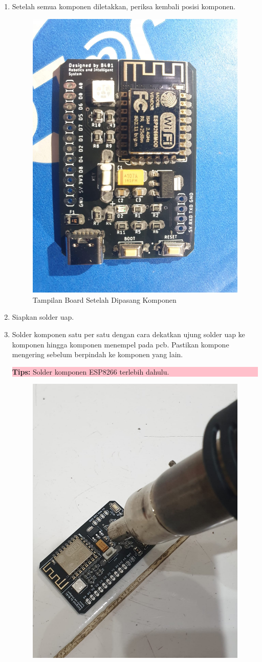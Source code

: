 \begin{enumerate}
    \item Setelah semua komponen diletakkan, periksa kembali posisi komponen.
    \begin{figure}[H]
        \centering
        \includegraphics[width=0.4\linewidth]{P4/img/5_tampilan_board_ketika_sudah_dipasang_komponen.jpeg}
        \caption{Tampilan Board Setelah Dipasang Komponen}
        \label{fig:KeadaanBoardSetelahDipasangKomponen}
    \end{figure}
    \item Siapkan solder uap.
    \item Solder komponen satu per satu dengan cara dekatkan ujung solder uap ke komponen hingga komponen menempel pada pcb. Pastikan kompone mengering sebelum berpindah ke komponen yang lain.
    \begin{center}
        \colorbox{pink}{\parbox{0.8\linewidth}{\textbf{Tips:} Solder komponen ESP8266 terlebih dahulu.}}
    \end{center}
    \begin{figure}[H]
        \centering
        \includegraphics[width=0.4\linewidth]{P4/img/7_posisi_solder_uap_yang_benar.jpeg}

\end{figure}
\end{enumerate}
